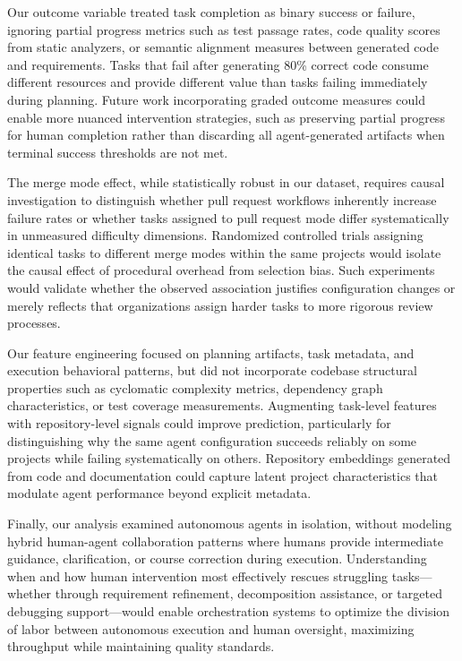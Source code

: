 \documentclass[]{article}
\begin{document}
Our outcome variable treated task completion as binary success or failure, ignoring partial progress metrics such as test passage rates, code quality scores from static analyzers, or semantic alignment measures between generated code and requirements. Tasks that fail after generating 80\% correct code consume different resources and provide different value than tasks failing immediately during planning. Future work incorporating graded outcome measures could enable more nuanced intervention strategies, such as preserving partial progress for human completion rather than discarding all agent-generated artifacts when terminal success thresholds are not met.

The merge mode effect, while statistically robust in our dataset, requires causal investigation to distinguish whether pull request workflows inherently increase failure rates or whether tasks assigned to pull request mode differ systematically in unmeasured difficulty dimensions. Randomized controlled trials assigning identical tasks to different merge modes within the same projects would isolate the causal effect of procedural overhead from selection bias. Such experiments would validate whether the observed association justifies configuration changes or merely reflects that organizations assign harder tasks to more rigorous review processes.

Our feature engineering focused on planning artifacts, task metadata, and execution behavioral patterns, but did not incorporate codebase structural properties such as cyclomatic complexity metrics, dependency graph characteristics, or test coverage measurements. Augmenting task-level features with repository-level signals could improve prediction, particularly for distinguishing why the same agent configuration succeeds reliably on some projects while failing systematically on others. Repository embeddings generated from code and documentation could capture latent project characteristics that modulate agent performance beyond explicit metadata.

Finally, our analysis examined autonomous agents in isolation, without modeling hybrid human-agent collaboration patterns where humans provide intermediate guidance, clarification, or course correction during execution. Understanding when and how human intervention most effectively rescues struggling tasks—whether through requirement refinement, decomposition assistance, or targeted debugging support—would enable orchestration systems to optimize the division of labor between autonomous execution and human oversight, maximizing throughput while maintaining quality standards.
\end{document}
